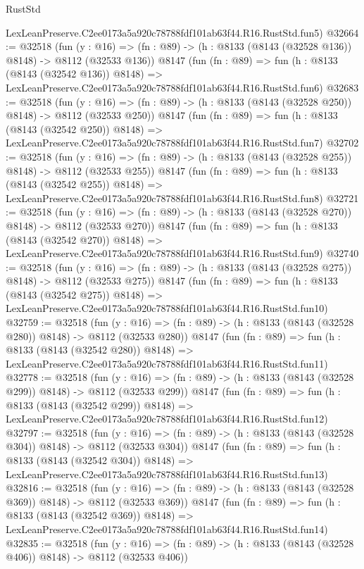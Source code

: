 \begin{lexlean}{RustStd}
\begin{coremodule}
    LexLeanPreserve.C2ee0173a5a920c78788fdf101ab63f44.R16.RustStd.fun5)
@32664 := @32518
    (fun (y : @16) => (fn : @89) -> (h : @8133 (@8143 (@32528 @136)) @8148) -> @8112 (@32533 @136))
    @8147
    (fun (fn : @89) =>
    fun (h : @8133 (@8143 (@32542 @136)) @8148) =>
    LexLeanPreserve.C2ee0173a5a920c78788fdf101ab63f44.R16.RustStd.fun6)
@32683 := @32518
    (fun (y : @16) => (fn : @89) -> (h : @8133 (@8143 (@32528 @250)) @8148) -> @8112 (@32533 @250))
    @8147
    (fun (fn : @89) =>
    fun (h : @8133 (@8143 (@32542 @250)) @8148) =>
    LexLeanPreserve.C2ee0173a5a920c78788fdf101ab63f44.R16.RustStd.fun7)
@32702 := @32518
    (fun (y : @16) => (fn : @89) -> (h : @8133 (@8143 (@32528 @255)) @8148) -> @8112 (@32533 @255))
    @8147
    (fun (fn : @89) =>
    fun (h : @8133 (@8143 (@32542 @255)) @8148) =>
    LexLeanPreserve.C2ee0173a5a920c78788fdf101ab63f44.R16.RustStd.fun8)
@32721 := @32518
    (fun (y : @16) => (fn : @89) -> (h : @8133 (@8143 (@32528 @270)) @8148) -> @8112 (@32533 @270))
    @8147
    (fun (fn : @89) =>
    fun (h : @8133 (@8143 (@32542 @270)) @8148) =>
    LexLeanPreserve.C2ee0173a5a920c78788fdf101ab63f44.R16.RustStd.fun9)
@32740 := @32518
    (fun (y : @16) => (fn : @89) -> (h : @8133 (@8143 (@32528 @275)) @8148) -> @8112 (@32533 @275))
    @8147
    (fun (fn : @89) =>
    fun (h : @8133 (@8143 (@32542 @275)) @8148) =>
    LexLeanPreserve.C2ee0173a5a920c78788fdf101ab63f44.R16.RustStd.fun10)
@32759 := @32518
    (fun (y : @16) => (fn : @89) -> (h : @8133 (@8143 (@32528 @280)) @8148) -> @8112 (@32533 @280))
    @8147
    (fun (fn : @89) =>
    fun (h : @8133 (@8143 (@32542 @280)) @8148) =>
    LexLeanPreserve.C2ee0173a5a920c78788fdf101ab63f44.R16.RustStd.fun11)
@32778 := @32518
    (fun (y : @16) => (fn : @89) -> (h : @8133 (@8143 (@32528 @299)) @8148) -> @8112 (@32533 @299))
    @8147
    (fun (fn : @89) =>
    fun (h : @8133 (@8143 (@32542 @299)) @8148) =>
    LexLeanPreserve.C2ee0173a5a920c78788fdf101ab63f44.R16.RustStd.fun12)
@32797 := @32518
    (fun (y : @16) => (fn : @89) -> (h : @8133 (@8143 (@32528 @304)) @8148) -> @8112 (@32533 @304))
    @8147
    (fun (fn : @89) =>
    fun (h : @8133 (@8143 (@32542 @304)) @8148) =>
    LexLeanPreserve.C2ee0173a5a920c78788fdf101ab63f44.R16.RustStd.fun13)
@32816 := @32518
    (fun (y : @16) => (fn : @89) -> (h : @8133 (@8143 (@32528 @369)) @8148) -> @8112 (@32533 @369))
    @8147
    (fun (fn : @89) =>
    fun (h : @8133 (@8143 (@32542 @369)) @8148) =>
    LexLeanPreserve.C2ee0173a5a920c78788fdf101ab63f44.R16.RustStd.fun14)
@32835 := @32518
    (fun (y : @16) => (fn : @89) -> (h : @8133 (@8143 (@32528 @406)) @8148) -> @8112 (@32533 @406))

\end{coremodule}
\end{lexlean}
